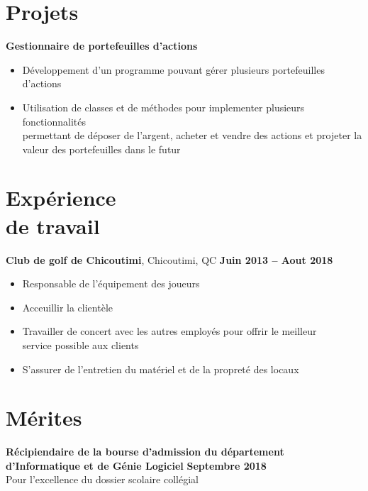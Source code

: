 \documentclass[margin,line]{resume}
\begin{document}
\begin{resume}
    \section{\mysidestyle Projets}
    \textbf{Gestionnaire de portefeuilles d'actions} \vspace{2mm}\\\vspace{1mm}%
    \begin{itemize}[nosep]
        \item D\'{e}veloppement d'un programme pouvant g\'{e}rer plusieurs portefeuilles \\d'actions
        \item Utilisation de classes et de m\'{e}thodes pour implementer plusieurs fonctionnalit\'{e}s \\
	      permettant de d\'{e}poser de l'argent, acheter et vendre des actions et projeter la \\
	      valeur des portefeuilles dans le futur
    \end{itemize}

    \section{\mysidestyle Exp\'{e}rience\\de travail}
    \textbf{Club de golf de Chicoutimi}, Chicoutimi, QC \hfill \textbf{Juin 2013 -- Aout 2018} \vspace{2mm}\\\vspace{1mm}%
    \begin{itemize}[nosep]
        \item Responsable de l'\'{e}quipement des joueurs
        \item Acceuillir la client\`{e}le
        \item Travailler de concert avec les autres employ\'{e}s pour offrir le meilleur \\ service possible aux clients
        \item S'assurer de l'entretien du mat\'{e}riel et de la propret\'{e} des locaux
    \end{itemize}


    \section{\mysidestyle M\'{e}rites}
     \textbf{R\'{e}cipiendaire de la bourse d'admission du d\'{e}partement \\ d'Informatique et de G\'{e}nie Logiciel }
     \hfill \textbf{Septembre 2018} \vspace{2mm}\\\vspace{1mm}%
        Pour l'excellence du dossier scolaire coll\'{e}gial


\end{resume}
\end{document}
